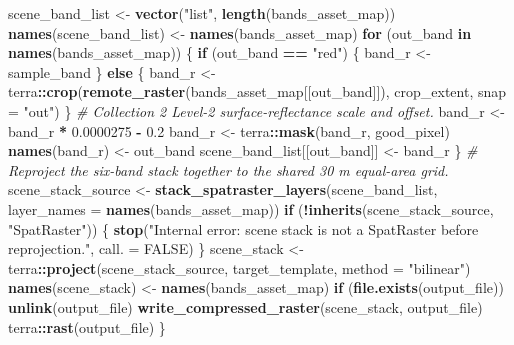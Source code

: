 \documentclass[
]{article}
\newenvironment{Shaded}{\begin{snugshade}}{\end{snugshade}}
\newcommand{\AttributeTok}[1]{\textcolor[rgb]{0.13,0.29,0.53}{#1}}
\newcommand{\CommentTok}[1]{\textcolor[rgb]{0.56,0.35,0.01}{\textit{#1}}}
\newcommand{\ConstantTok}[1]{\textcolor[rgb]{0.56,0.35,0.01}{#1}}
\newcommand{\ControlFlowTok}[1]{\textcolor[rgb]{0.13,0.29,0.53}{\textbf{#1}}}
\newcommand{\FloatTok}[1]{\textcolor[rgb]{0.00,0.00,0.81}{#1}}
\newcommand{\FunctionTok}[1]{\textcolor[rgb]{0.13,0.29,0.53}{\textbf{#1}}}
\newcommand{\NormalTok}[1]{#1}
\newcommand{\OtherTok}[1]{\textcolor[rgb]{0.56,0.35,0.01}{#1}}
\newcommand{\SpecialCharTok}[1]{\textcolor[rgb]{0.81,0.36,0.00}{\textbf{#1}}}
\newcommand{\StringTok}[1]{\textcolor[rgb]{0.31,0.60,0.02}{#1}}
\begin{document}
\begin{Shaded}
\begin{Highlighting}[]
\NormalTok{  scene\_band\_list }\OtherTok{\textless{}{-}} \FunctionTok{vector}\NormalTok{(}\StringTok{"list"}\NormalTok{, }\FunctionTok{length}\NormalTok{(bands\_asset\_map))}
  \FunctionTok{names}\NormalTok{(scene\_band\_list) }\OtherTok{\textless{}{-}} \FunctionTok{names}\NormalTok{(bands\_asset\_map)}
  \ControlFlowTok{for}\NormalTok{ (out\_band }\ControlFlowTok{in} \FunctionTok{names}\NormalTok{(bands\_asset\_map)) \{}
    \ControlFlowTok{if}\NormalTok{ (out\_band }\SpecialCharTok{==} \StringTok{"red"}\NormalTok{) \{}
\NormalTok{      band\_r }\OtherTok{\textless{}{-}}\NormalTok{ sample\_band}
\NormalTok{    \} }\ControlFlowTok{else}\NormalTok{ \{}
\NormalTok{      band\_r }\OtherTok{\textless{}{-}}\NormalTok{ terra}\SpecialCharTok{::}\FunctionTok{crop}\NormalTok{(}\FunctionTok{remote\_raster}\NormalTok{(bands\_asset\_map[[out\_band]]), crop\_extent, }\AttributeTok{snap =} \StringTok{"out"}\NormalTok{)}
\NormalTok{    \}}
    \CommentTok{\# Collection 2 Level{-}2 surface{-}reflectance scale and offset.}
\NormalTok{    band\_r }\OtherTok{\textless{}{-}}\NormalTok{ band\_r }\SpecialCharTok{*} \FloatTok{0.0000275} \SpecialCharTok{{-}} \FloatTok{0.2}
\NormalTok{    band\_r }\OtherTok{\textless{}{-}}\NormalTok{ terra}\SpecialCharTok{::}\FunctionTok{mask}\NormalTok{(band\_r, good\_pixel)}
    \FunctionTok{names}\NormalTok{(band\_r) }\OtherTok{\textless{}{-}}\NormalTok{ out\_band}
\NormalTok{    scene\_band\_list[[out\_band]] }\OtherTok{\textless{}{-}}\NormalTok{ band\_r}
\NormalTok{  \}}
  \CommentTok{\# Reproject the six{-}band stack together to the shared 30 m equal{-}area grid.}
\NormalTok{  scene\_stack\_source }\OtherTok{\textless{}{-}} \FunctionTok{stack\_spatraster\_layers}\NormalTok{(scene\_band\_list, }\AttributeTok{layer\_names =} \FunctionTok{names}\NormalTok{(bands\_asset\_map))}
  \ControlFlowTok{if}\NormalTok{ (}\SpecialCharTok{!}\FunctionTok{inherits}\NormalTok{(scene\_stack\_source, }\StringTok{"SpatRaster"}\NormalTok{)) \{}
    \FunctionTok{stop}\NormalTok{(}\StringTok{"Internal error: scene stack is not a SpatRaster before reprojection."}\NormalTok{, }\AttributeTok{call. =} \ConstantTok{FALSE}\NormalTok{)}
\NormalTok{  \}}
\NormalTok{  scene\_stack }\OtherTok{\textless{}{-}}\NormalTok{ terra}\SpecialCharTok{::}\FunctionTok{project}\NormalTok{(scene\_stack\_source, target\_template, }\AttributeTok{method =} \StringTok{"bilinear"}\NormalTok{)}
  \FunctionTok{names}\NormalTok{(scene\_stack) }\OtherTok{\textless{}{-}} \FunctionTok{names}\NormalTok{(bands\_asset\_map)}
  \ControlFlowTok{if}\NormalTok{ (}\FunctionTok{file.exists}\NormalTok{(output\_file)) }\FunctionTok{unlink}\NormalTok{(output\_file)}
  \FunctionTok{write\_compressed\_raster}\NormalTok{(scene\_stack, output\_file)}
\NormalTok{  terra}\SpecialCharTok{::}\FunctionTok{rast}\NormalTok{(output\_file)}
\NormalTok{\}}


\end{Highlighting}
\end{Shaded}
\end{document}
